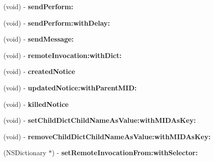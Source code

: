 \begin{DoxyCompactItemize}
\item 
\hypertarget{interface_messenger_system_a60cbd00cd24aa502aa77d86e4391a1b7}{
(void) -\/ {\bfseries sendPerform:}}
\label{interface_messenger_system_a60cbd00cd24aa502aa77d86e4391a1b7}

\item 
\hypertarget{interface_messenger_system_a12e9a8d84b6cb12f55bf7453166cfab1}{
(void) -\/ {\bfseries sendPerform:withDelay:}}
\label{interface_messenger_system_a12e9a8d84b6cb12f55bf7453166cfab1}

\item 
\hypertarget{interface_messenger_system_a0938a6c892b3a634870238b4555dc921}{
(void) -\/ {\bfseries sendMessage:}}
\label{interface_messenger_system_a0938a6c892b3a634870238b4555dc921}

\item 
\hypertarget{interface_messenger_system_a51502df160822ba7c6fd754fdc6353de}{
(void) -\/ {\bfseries remoteInvocation:withDict:}}
\label{interface_messenger_system_a51502df160822ba7c6fd754fdc6353de}

\item 
\hypertarget{interface_messenger_system_a7e77f9abb100c6123caaa291d7f92ffb}{
(void) -\/ {\bfseries createdNotice}}
\label{interface_messenger_system_a7e77f9abb100c6123caaa291d7f92ffb}

\item 
\hypertarget{interface_messenger_system_a28703ac96f244da4d7c62207cf65ff69}{
(void) -\/ {\bfseries updatedNotice:withParentMID:}}
\label{interface_messenger_system_a28703ac96f244da4d7c62207cf65ff69}

\item 
\hypertarget{interface_messenger_system_a127cce35cc1c079fed1bceecccf23a66}{
(void) -\/ {\bfseries killedNotice}}
\label{interface_messenger_system_a127cce35cc1c079fed1bceecccf23a66}

\item 
\hypertarget{interface_messenger_system_a57dd4208efc5d477c50c5c5f55fe7ff1}{
(void) -\/ {\bfseries setChildDictChildNameAsValue:withMIDAsKey:}}
\label{interface_messenger_system_a57dd4208efc5d477c50c5c5f55fe7ff1}

\item 
\hypertarget{interface_messenger_system_aadeb829f6e394bbc36d77593ed6fe677}{
(void) -\/ {\bfseries removeChildDictChildNameAsValue:withMIDAsKey:}}
\label{interface_messenger_system_aadeb829f6e394bbc36d77593ed6fe677}

\item 
\hypertarget{interface_messenger_system_a60c9a5dc9cf6d420d944edead0c957d8}{
(NSDictionary $\ast$) -\/ {\bfseries setRemoteInvocationFrom:withSelector:}}
\label{interface_messenger_system_a60c9a5dc9cf6d420d944edead0c957d8}


\end{DoxyCompactItemize}
